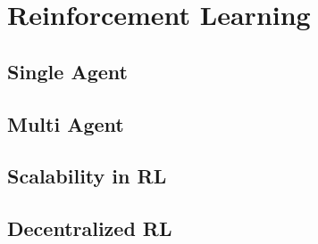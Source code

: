 
\chapter{Reinforcement Learning}
\section{Single Agent}
\section{Multi Agent}
\section{Scalability in RL}
\section{Decentralized RL}